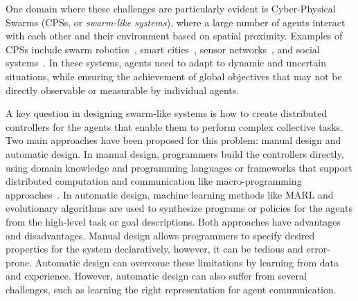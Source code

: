 \documentclass[conference]{IEEEtran}
\begin{document}
One domain where these challenges are particularly evident is Cyber-Physical Swarms (CPSs, or \emph{swarm-like systems}), 
 where a large number of agents interact with each other and their environment based on spatial proximity. 
%
Examples of CPSs include swarm robotics~\cite{brambilla2013swarm}, smart cities~\cite{bajovic2021marvel}, sensor networks~\cite{pianini2022collective}, and social systems~\cite{zhou2019cyber}. 
 In these systems, agents need to adapt to dynamic and uncertain situations, while ensuring the achievement of global objectives that may not be directly observable or measurable by individual agents.

A key question in designing swarm-like systems is how to create distributed controllers for the agents that enable them to perform complex collective tasks. 
 Two main approaches have been proposed for this problem: manual design and automatic design. 
%
In manual design, programmers build the controllers directly, 
 using domain knowledge and programming languages or frameworks that support distributed computation and communication like macro-programming approaches~\cite{DBLP:journals/corr/abs-2201-03473}. 
%
In automatic design, machine learning methods like \ac{MARL} and evolutionary algorithms are used to synthesize programs or policies for the agents from the high-level task or goal descriptions.
%
Both approaches have advantages and disadvantages.
 Manual design allows programmers to specify desired properties for the system declaratively, however, it can be tedious and error-prone.
%
Automatic design can overcome these limitations by learning from data and experience. 
 However, automatic design can also suffer from several challenges, such as learning the right representation for agent communication.
%
\end{document}

